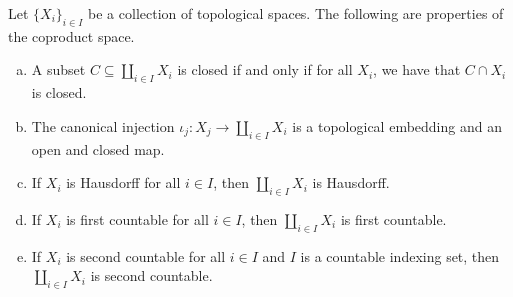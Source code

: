 \begin{proposition}
  Let \(\{X_i\}_{i \in I}\) be a collection of topological spaces. The following
  are properties of the coproduct space.
  \begin{enumerate}[(a)]
    \item A subset \(C \subseteq \coprod_{i \in I} X_i\) is closed if and only
      if for all \(X_i\), we have that \(C \cap X_i\) is closed.
    \item The canonical injection \(\iota_j: X_j \to \coprod_{i \in I} X_i\) is
      a topological embedding and an open and closed map.
    \item If \(X_i\) is Hausdorff for all \(i \in I\), then \(\coprod_{i \in
      I} X_i\) is Hausdorff.
    \item If \(X_i\) is first countable for all \(i \in I\), then \(\coprod_{i
      \in I} X_i\) is first countable.
    \item If \(X_i\) is second countable for all \(i \in I\) and \(I\) is a
      countable indexing set, then \(\coprod_{i \in I} X_i\) is second
      countable.
  \end{enumerate}
\end{proposition}

